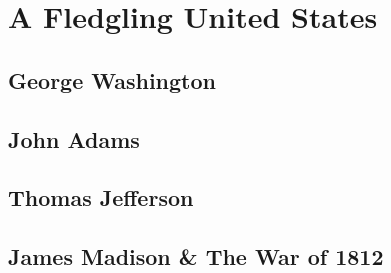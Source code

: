 \chapter{A Fledgling United States}

\section{George Washington}

\section{John Adams}

\section{Thomas Jefferson}

\section{James Madison \& The War of 1812}
